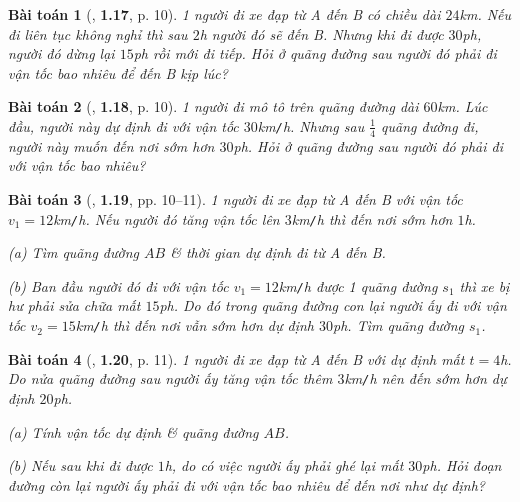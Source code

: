 \documentclass{article}
\numberwithin{equation}{section}
\newtheorem{baitoan}{Bài toán}[section]
\begin{document}
\begin{baitoan}[\cite{Van2022}, \textbf{1.17}, p. 10]
	1 người đi xe đạp từ A đến B có chiều dài $24$\emph{km}. Nếu đi liên tục không nghỉ thì sau $2$\emph{h} người đó sẽ đến B. Nhưng khi đi được $30$\emph{ph}, người đó dừng lại $15$\emph{ph} rồi mới đi tiếp. Hỏi ở quãng đường sau người đó phải đi vận tốc bao nhiêu để đến B kịp lúc?
\end{baitoan}

\begin{baitoan}[\cite{Van2022}, \textbf{1.18}, p. 10]
	1 người đi mô tô trên quãng đường dài $60$\emph{km}. Lúc đầu, người này dự định đi với vận tốc $30$\emph{km\texttt{/}h}. Nhưng sau $\frac{1}{4}$ quãng đường đi, người này muốn đến nơi sớm hơn $30$\emph{ph}. Hỏi ở quãng đường sau người đó phải đi với vận tốc bao nhiêu?
\end{baitoan}

\begin{baitoan}[\cite{Van2022}, \textbf{1.19}, pp. 10--11]
	1 người đi xe đạp từ A đến B với vận tốc $v_1 = 12$\emph{km\texttt{/}h}. Nếu người đó tăng vận tốc lên $3$\emph{km\texttt{/}h} thì đến nơi sớm hơn $1$\emph{h}.
	\begin{enumerate*}
		\item[(a)] Tìm quãng đường $AB$ \& thời gian dự định đi từ A đến B.
		\item[(b)] Ban đầu người đó đi với vận tốc $v_1 = 12$\emph{km\texttt{/}h} được 1 quãng đường $s_1$ thì xe bị hư phải sửa chữa mất $15$\emph{ph}. Do đó trong quãng đường con lại người ấy đi với vận tốc $v_2 = 15$\emph{km\texttt{/}h} thì đến nơi vẫn sớm hơn dự định $30$\emph{ph}. Tìm quãng đường $s_1$.
	\end{enumerate*}
\end{baitoan}

\begin{baitoan}[\cite{Van2022}, \textbf{1.20}, p. 11]
	1 người đi xe đạp từ A đến B với dự định mất $t = 4$\emph{h}. Do nửa quãng đường sau người ấy tăng vận tốc thêm $3$\emph{km\texttt{/}h} nên đến sớm hơn dự định $20$\emph{ph}.
	\begin{enumerate*}
		\item[(a)] Tính vận tốc dự định \& quãng đường $AB$.
		\item[(b)] Nếu sau khi đi được $1$\emph{h}, do có việc người ấy phải ghé lại mất $30$\emph{ph}. Hỏi đoạn đường còn lại người ấy phải đi với vận tốc bao nhiêu để đến nơi như dự định?
	\end{enumerate*}
\end{baitoan}
\end{document}
